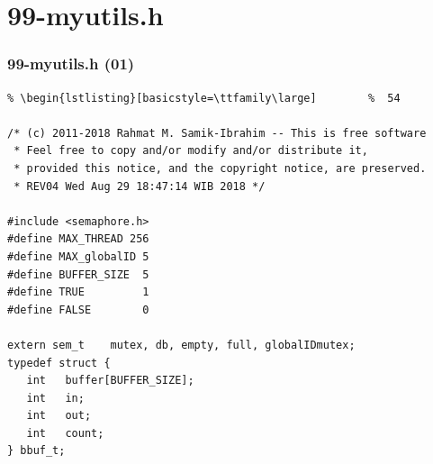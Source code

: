\documentclass[aspectratio=169, xcolor=table, notheorems, hyperref={pdfpagelabels=false}]{beamer}
\begin{document}
\section{99-myutils.h}
\begin{frame}[fragile]
\frametitle{99-myutils.h (01)}
\begin{lstlisting}[basicstyle=\ttfamily\footnotesize] %  72
% \begin{lstlisting}[basicstyle=\ttfamily\small]        %  65
% \begin{lstlisting}[basicstyle=\ttfamily\large]        %  54

/* (c) 2011-2018 Rahmat M. Samik-Ibrahim -- This is free software
 * Feel free to copy and/or modify and/or distribute it, 
 * provided this notice, and the copyright notice, are preserved. 
 * REV04 Wed Aug 29 18:47:14 WIB 2018 */

#include <semaphore.h>
#define MAX_THREAD 256
#define MAX_globalID 5
#define BUFFER_SIZE  5
#define TRUE         1
#define FALSE        0

extern sem_t    mutex, db, empty, full, globalIDmutex;
typedef struct {
   int   buffer[BUFFER_SIZE];
   int   in;
   int   out;
   int   count;
} bbuf_t;

\end{lstlisting}
\end{frame}
\end{document}
